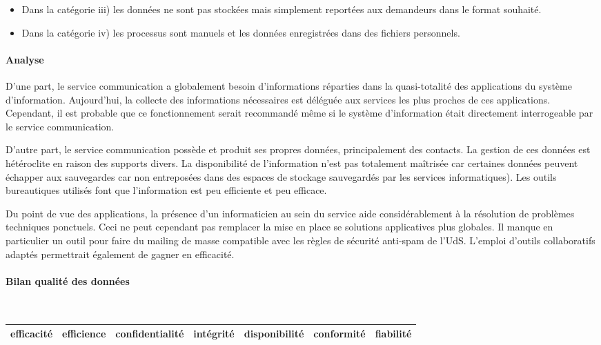 \documentclass{book}
\begin{document}
\begin{itemize}
\item Dans la catégorie iii) les données ne sont pas stockées mais simplement reportées
	aux demandeurs dans le format souhaité.

\item Dans la catégorie iv) les processus sont manuels et les données enregistrées
	dans des fichiers personnels.
\end{itemize}

\paragraph{Analyse}

D'une part, le service communication a globalement besoin d'informations 
réparties dans la quasi-totalité des applications du système d'information.
Aujourd'hui, la collecte des informations nécessaires est déléguée aux
services les plus proches de ces applications. Cependant, il est probable 
que ce fonctionnement serait recommandé même si le système d'information
était directement interrogeable par le service communication.

D'autre part, le service communication possède et produit ses propres
données, principalement des contacts. La gestion de ces données
est hétéroclite en raison des supports divers. La disponibilité de
l'information n'est pas totalement maîtrisée car certaines données peuvent
échapper aux sauvegardes car non entreposées dans des espaces de stockage
sauvegardés par les services informatiques). Les outils bureautiques utilisés
font que l'information est peu efficiente et peu efficace. 


Du point de vue des applications, la présence d'un informaticien au
sein du service aide considérablement à la résolution de problèmes
techniques ponctuels. Ceci ne peut cependant pas remplacer la mise
en place se solutions applicatives plus globales. Il manque en particulier
un outil pour faire du mailing de masse compatible avec les règles de
sécurité anti-spam de l'UdS. L'emploi d'outils collaboratifs adaptés 
permettrait également de gagner en efficacité. 


\paragraph{Bilan qualité des données}
~\\


	\begin{tabular}{|l|l|l|l|l|l|l|}
	\hline
	efficacité	& efficience &	confidentialité	& intégrité & disponibilité & conformité & fiabilité \\
	\hline
	
	\hline
	\end{tabular}
	
\end{document}
